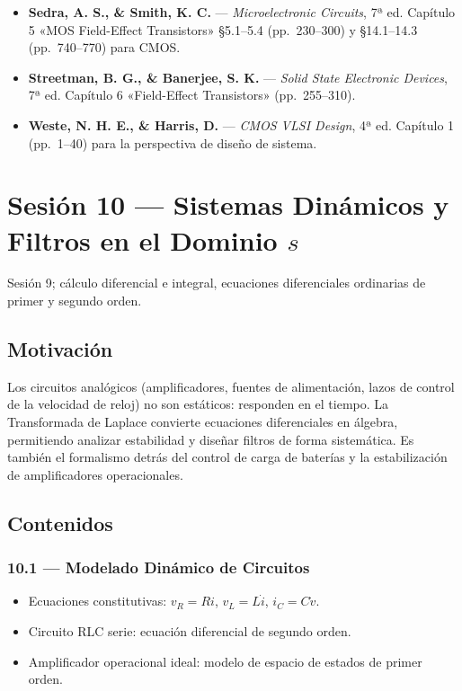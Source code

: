 \documentclass[11pt, letterpaper]{article}
\begin{document}
\begin{lecturas}
\begin{itemize}
  \item[$(\star)$] \textbf{Sedra, A. S., \& Smith, K. C.} — \emph{Microelectronic Circuits}, 7ª ed. Capítulo 5 «MOS Field-Effect Transistors» §5.1--5.4 (pp.\ 230--300) y §14.1--14.3 (pp.\ 740--770) para CMOS.
  \item[$(\star)$] \textbf{Streetman, B. G., \& Banerjee, S. K.} — \emph{Solid State Electronic Devices}, 7ª ed. Capítulo 6 «Field-Effect Transistors» (pp.\ 255--310).
  \item \textbf{Weste, N. H. E., \& Harris, D.} — \emph{CMOS VLSI Design}, 4ª ed. Capítulo 1 (pp.\ 1--40) para la perspectiva de diseño de sistema.
\end{itemize}
\end{lecturas}

\newpage

\section{Sesión 10 — Sistemas Dinámicos y Filtros en el Dominio $s$}

\begin{prereqs}
Sesión 9; cálculo diferencial e integral, ecuaciones diferenciales ordinarias de primer y segundo orden.
\end{prereqs}

\subsection*{Motivación}
Los circuitos analógicos (amplificadores, fuentes de alimentación, lazos de control de la velocidad de reloj) no son estáticos: responden en el tiempo. La Transformada de Laplace convierte ecuaciones diferenciales en álgebra, permitiendo analizar estabilidad y diseñar filtros de forma sistemática. Es también el formalismo detrás del control de carga de baterías y la estabilización de amplificadores operacionales.

\subsection{Contenidos}

\subsubsection{10.1 — Modelado Dinámico de Circuitos}
\begin{itemize}
  \item Ecuaciones constitutivas: $v_R=Ri$, $v_L=L\dot{i}$, $i_C=C\dot{v}$.
  \item Circuito RLC serie: ecuación diferencial de segundo orden.
  \item Amplificador operacional ideal: modelo de espacio de estados de primer orden.
\end{itemize}
\end{document}
